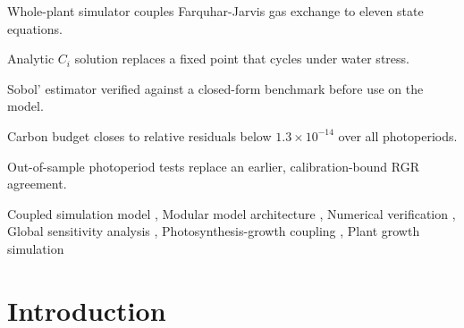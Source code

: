 \documentclass[a4paper,fleqn]{cas-sc}
\begin{document}

\begin{highlights}
\item Whole-plant simulator couples Farquhar-Jarvis gas exchange to eleven state equations.
\item Analytic $C_i$ solution replaces a fixed point that cycles under water stress.
\item Sobol' estimator verified against a closed-form benchmark before use on the model.
\item Carbon budget closes to relative residuals below $1.3\times10^{-14}$ over all photoperiods.
\item Out-of-sample photoperiod tests replace an earlier, calibration-bound RGR agreement.
\end{highlights}


\begin{keywords}
Coupled simulation model \sep
Modular model architecture \sep
Numerical verification \sep
Global sensitivity analysis \sep
Photosynthesis-growth coupling \sep
Plant growth simulation
\end{keywords}

\maketitle

\section{Introduction}
\label{sec:introduction}
\end{document}
